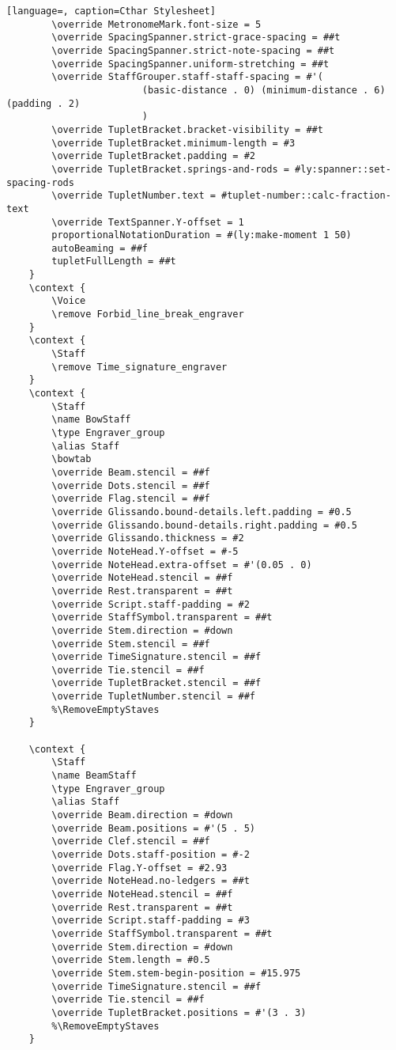 \begin{lstlisting}[language=, caption=Cthar Stylesheet]
		\override MetronomeMark.font-size = 5
        \override SpacingSpanner.strict-grace-spacing = ##t
        \override SpacingSpanner.strict-note-spacing = ##t
        \override SpacingSpanner.uniform-stretching = ##t
        \override StaffGrouper.staff-staff-spacing = #'(
						(basic-distance . 0) (minimum-distance . 6) (padding . 2)
						)
        \override TupletBracket.bracket-visibility = ##t
        \override TupletBracket.minimum-length = #3
        \override TupletBracket.padding = #2
        \override TupletBracket.springs-and-rods = #ly:spanner::set-spacing-rods
        \override TupletNumber.text = #tuplet-number::calc-fraction-text
		\override TextSpanner.Y-offset = 1
		proportionalNotationDuration = #(ly:make-moment 1 50)
        autoBeaming = ##f
        tupletFullLength = ##t
    }
	\context {
        \Voice
        \remove Forbid_line_break_engraver
    }
    \context {
        \Staff
        \remove Time_signature_engraver
    }
	\context {
        \Staff
        \name BowStaff
        \type Engraver_group
        \alias Staff
        \bowtab
        \override Beam.stencil = ##f
        \override Dots.stencil = ##f
        \override Flag.stencil = ##f
        \override Glissando.bound-details.left.padding = #0.5
        \override Glissando.bound-details.right.padding = #0.5
        \override Glissando.thickness = #2
        \override NoteHead.Y-offset = #-5
        \override NoteHead.extra-offset = #'(0.05 . 0)
		\override NoteHead.stencil = ##f
		\override Rest.transparent = ##t
        \override Script.staff-padding = #2
        \override StaffSymbol.transparent = ##t
        \override Stem.direction = #down
        \override Stem.stencil = ##f
        \override TimeSignature.stencil = ##f
		\override Tie.stencil = ##f
        \override TupletBracket.stencil = ##f
        \override TupletNumber.stencil = ##f
		%\RemoveEmptyStaves
    }

	\context {
        \Staff
        \name BeamStaff
        \type Engraver_group
        \alias Staff
        \override Beam.direction = #down
        \override Beam.positions = #'(5 . 5)
        \override Clef.stencil = ##f
        \override Dots.staff-position = #-2
        \override Flag.Y-offset = #2.93
        \override NoteHead.no-ledgers = ##t
        \override NoteHead.stencil = ##f
		\override Rest.transparent = ##t
        \override Script.staff-padding = #3
        \override StaffSymbol.transparent = ##t
        \override Stem.direction = #down
        \override Stem.length = #0.5
        \override Stem.stem-begin-position = #15.975
        \override TimeSignature.stencil = ##f
		\override Tie.stencil = ##f
        \override TupletBracket.positions = #'(3 . 3)
		%\RemoveEmptyStaves
    }


\end{lstlisting}

